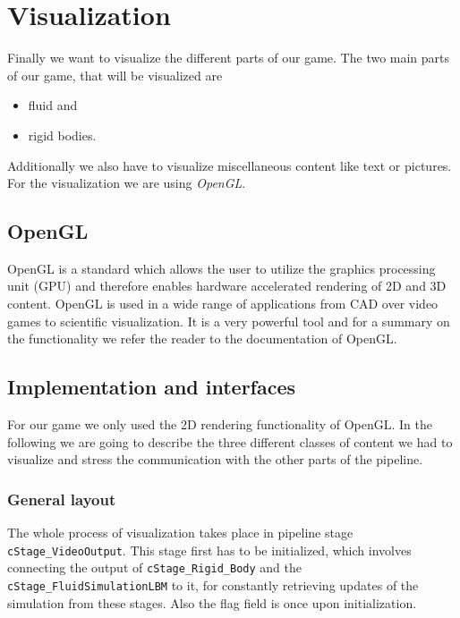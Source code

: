 \section{Visualization}
Finally we want to visualize the different parts of our game. The two main parts of our game, that will be visualized are 
\begin{itemize}
\item fluid and
\item rigid bodies.
\end{itemize}
Additionally we also have to visualize miscellaneous content like text or pictures. For the visualization we are using \emph{OpenGL}\cite{OpenGL}.

\subsection{OpenGL}
OpenGL is a standard which allows the user to utilize the graphics processing unit (GPU) and therefore enables hardware accelerated rendering of 2D and 3D content. OpenGL is used in a wide range of applications from CAD over video games to scientific visualization. It is a very powerful tool and for a summary on the functionality we refer the reader to the documentation of OpenGL. 

\subsection{Implementation and interfaces}
For our game we only used the 2D rendering functionality of OpenGL. In the following we are going to describe the three different classes of content we had to visualize and stress the communication with the other parts of the pipeline. 

\subsubsection{General layout}
The whole process of visualization takes place in pipeline stage \texttt{cStage_VideoOutput}. This stage first has to be initialized, which involves connecting the output of \texttt{cStage_Rigid_Body} and the \texttt{cStage_FluidSimulationLBM} to it, for constantly retrieving updates of the simulation from these stages. Also the flag field is once upon initialization.

